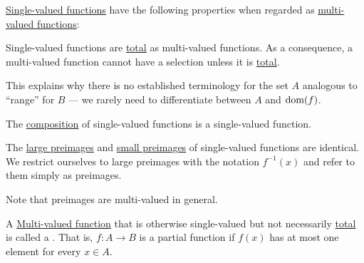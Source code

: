 \begin{proposition}\label{thm:function_properties}
  \hyperref[def:function]{Single-valued functions} have the following properties when regarded as \hyperref[def:multi_valued_function]{multi-valued functions}:
  \begin{thmenum}
     Single-valued functions are \hyperref[def:multi_valued_function/total]{total} as multi-valued functions. As a consequence, a multi-valued function cannot have a selection unless it is \hyperref[def:multi_valued_function/total]{total}.

    This explains why there is no established terminology for the set \( A \) analogous to \enquote{range} for \( B \) --- we rarely need to differentiate between \( A \) and \( \operatorname{dom}(f) \).

     The \hyperref[def:multi_valued_function/composition]{composition} of single-valued functions is a single-valued function.

     The \hyperref[def:multi_valued_function/large_preimage]{large preimages} and \hyperref[def:multi_valued_function/small_preimage]{small preimages} of single-valued functions are identical. We restrict ourselves to large preimages with the notation \( f^{-1}(x) \) and refer to them simply as preimages.

    Note that preimages are multi-valued in general.
  \end{thmenum}
\end{proposition}

\begin{definition}\label{def:partial_function}
  A \hyperref[def:multi_valued_function]{Multi-valued function} that is otherwise single-valued but not necessarily \hyperref[def:multi_valued_function/total]{total} is called a . That is, \( f: A \to B \) is a partial function if \( f(x) \) has at most one element for every \( x \in A \).
\end{definition}

